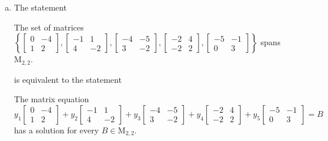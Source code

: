 \begin{exerciseAnswer}
\begin{enumerate}[(a)]
\item The statement 
\begin{center}\begin{minipage}{0.8\textwidth}
 The set of matrices \( \left\{ \left[\begin{array}{cc}
0 & -4 \\
1 & 2
\end{array}\right] , \left[\begin{array}{cc}
-1 & 1 \\
4 & -2
\end{array}\right] , \left[\begin{array}{cc}
-4 & -5 \\
3 & -2
\end{array}\right] , \left[\begin{array}{cc}
-2 & 4 \\
-2 & 2
\end{array}\right] , \left[\begin{array}{cc}
-5 & -1 \\
0 & 3
\end{array}\right] \right\} \) spans \(\mathrm{M}_{2,2}\). 
\end{minipage}\end{center}
     is equivalent to the statement 
\begin{center}\begin{minipage}{0.8\textwidth}
 The matrix equation \[ y_{1} \left[\begin{array}{cc}
0 & -4 \\
1 & 2
\end{array}\right] + y_{2} \left[\begin{array}{cc}
-1 & 1 \\
4 & -2
\end{array}\right] + y_{3} \left[\begin{array}{cc}
-4 & -5 \\
3 & -2
\end{array}\right] + y_{4} \left[\begin{array}{cc}
-2 & 4 \\
-2 & 2
\end{array}\right] + y_{5} \left[\begin{array}{cc}
-5 & -1 \\
0 & 3
\end{array}\right] =B\] has a solution for every \(B \in \mathrm{M}_{2,2}\). 
\end{minipage}\end{center}
    

\end{enumerate}
\end{exerciseAnswer}
